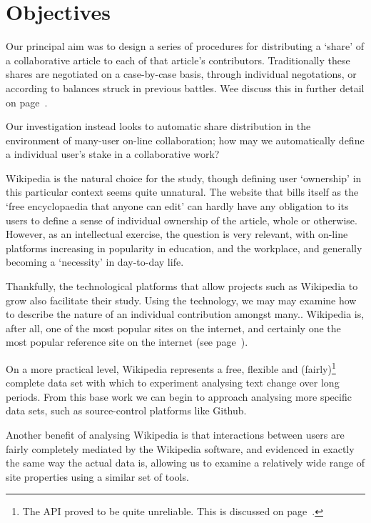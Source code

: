 \section{Objectives}
Our principal aim was to design a series of procedures for
distributing a `share' of a collaborative article to each of that
article's contributors. Traditionally these shares are negotiated on a
case-by-case basis, through individual negotations, or according to
balances struck in previous battles. Wee discuss this in further
detail on page~\pageref{sec:copyright}.

Our investigation instead looks to automatic share distribution in the
environment of many-user on-line collaboration; how may we
automatically define a individual user's stake in a collaborative
work?

Wikipedia is the natural choice for the study, though defining user
`ownership' in this particular context seems quite unnatural. The
website that bills itself as the `free encyclopaedia that anyone can
edit' can hardly have any obligation to its users to define a sense of
individual ownership of the article, whole or
otherwise.\cite{wiki-copyr} However, as an intellectual exercise, the
question is very relevant, with on-line platforms increasing in
popularity in education,\cite{wiki-collab} and the
workplace,\cite{workplace-future} and generally becoming a `necessity'
in day-to-day life.\cite{alsurvey}

Thankfully, the technological platforms that allow projects such as
Wikipedia to grow also facilitate their study. Using the technology,
we may may examine how to describe the nature of an individual
contribution amongst many.. Wikipedia is, after all, one of the most
popular sites on the internet, and certainly one the most popular
reference site on the internet (see page~\pageref{sec:popularity}).

On a more practical level, Wikipedia represents a free, flexible and
(fairly)\footnote{The API proved to be quite unreliable. This is
  discussed on page~\pageref{sec:wiki-api}.} complete data set with which to experiment analysing text
change over long periods. From this base work we can begin to approach
analysing more specific data sets, such as source-control platforms
like Github.

Another benefit of analysing Wikipedia is that interactions between
users are fairly completely mediated by the Wikipedia software, and
evidenced in exactly the same way the actual data is, allowing us to
examine a relatively wide range of site properties using a similar set
of tools.

